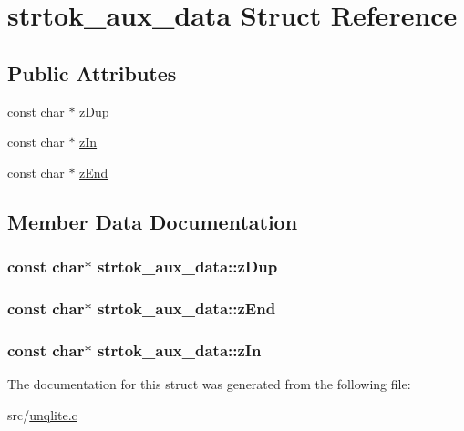\hypertarget{structstrtok__aux__data}{\section{strtok\-\_\-aux\-\_\-data Struct Reference}
\label{d8/d84/structstrtok__aux__data}
}
\subsection*{Public Attributes}
\begin{DoxyCompactItemize}
\item 
const char $\ast$ \hyperlink{structstrtok__aux__data_a2bfd6eab6f054b06a32c479d52507c9e}{z\-Dup}
\item 
const char $\ast$ \hyperlink{structstrtok__aux__data_a0e42fda019d1bac81bb4378f3d02c985}{z\-In}
\item 
const char $\ast$ \hyperlink{structstrtok__aux__data_a002a79d28eeaac86725b61eaf056559c}{z\-End}
\end{DoxyCompactItemize}


\subsection{Member Data Documentation}
\hypertarget{structstrtok__aux__data_a2bfd6eab6f054b06a32c479d52507c9e}{
\subsubsection[{z\-Dup}]{\setlength{\rightskip}{0pt plus 5cm}const char$\ast$ strtok\-\_\-aux\-\_\-data\-::z\-Dup}}\label{d8/d84/structstrtok__aux__data_a2bfd6eab6f054b06a32c479d52507c9e}
\hypertarget{structstrtok__aux__data_a002a79d28eeaac86725b61eaf056559c}{
\subsubsection[{z\-End}]{\setlength{\rightskip}{0pt plus 5cm}const char$\ast$ strtok\-\_\-aux\-\_\-data\-::z\-End}}\label{d8/d84/structstrtok__aux__data_a002a79d28eeaac86725b61eaf056559c}
\hypertarget{structstrtok__aux__data_a0e42fda019d1bac81bb4378f3d02c985}{
\subsubsection[{z\-In}]{\setlength{\rightskip}{0pt plus 5cm}const char$\ast$ strtok\-\_\-aux\-\_\-data\-::z\-In}}\label{d8/d84/structstrtok__aux__data_a0e42fda019d1bac81bb4378f3d02c985}


The documentation for this struct was generated from the following file\-:\begin{DoxyCompactItemize}
\item 
src/\hyperlink{unqlite_8c}{unqlite.\-c}\end{DoxyCompactItemize}

